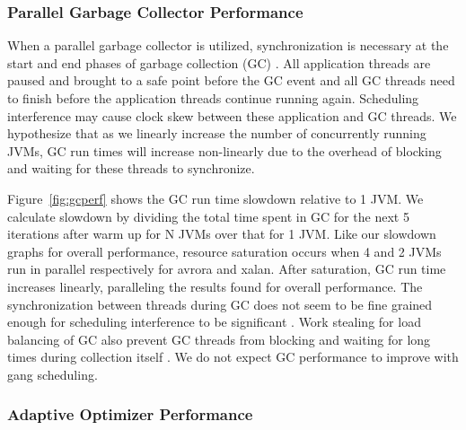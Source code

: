 \documentclass{sig-alternate}
\begin{document}
\subsubsection{Parallel Garbage Collector Performance}
When a parallel garbage collector is utilized, synchronization is necessary at the start and end phases of garbage collection (GC) \cite{hotspot:whitepaper}. All application threads are paused and brought to a safe point before the GC event and all GC threads need to finish before the application threads continue running again. Scheduling interference may cause clock skew between these application and GC threads. We hypothesize that as we linearly increase the number of concurrently running JVMs, GC run times will increase non-linearly due to the overhead of blocking and waiting for these threads to synchronize.

Figure~\ref{fig:gcperf} shows the GC run time slowdown relative to 1 JVM. We calculate slowdown by dividing the total time spent in GC for the next 5 iterations after warm up for N JVMs over that for 1 JVM. Like our slowdown graphs for overall performance, resource saturation occurs when 4 and 2 JVMs run in parallel respectively for avrora and xalan. After saturation, GC run time increases linearly, paralleling the results found for overall performance. The synchronization between threads during GC does not seem to be fine grained enough for scheduling interference to be significant \cite{feitelson1992gang}. Work stealing for load balancing of GC also prevent GC threads from blocking and waiting for long times during collection itself \cite{stoptheworldgc}. We do not expect GC performance to improve with gang scheduling.

\begin{figure*}
\centering
{}
\caption{GC run time slowdown relative to 1 JVM.}
\label{fig:gcperf}
\end{figure*}

\subsubsection{Adaptive Optimizer Performance}
\begin{figure*}
\centering
{}
\caption{Mean total run time of JVMs warmed up in isolation and with 16 running JVMs in parallel.}
\label{fig:jitperf}
\end{figure*}
 
\end{document}
